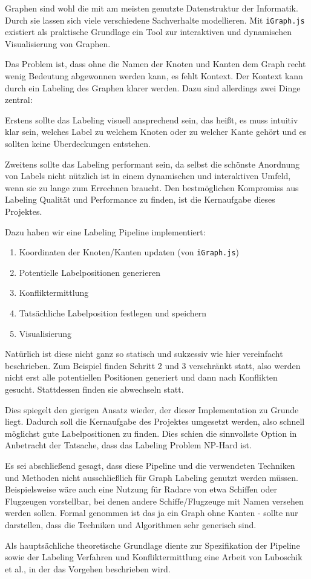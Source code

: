 Graphen sind wohl die mit am meisten genutzte Datenstruktur der Informatik.
Durch sie lassen sich viele verschiedene Sachverhalte modellieren.
Mit \texttt{iGraph.js} existiert als praktische Grundlage ein Tool zur interaktiven und dynamischen Visualisierung von Graphen.

Das Problem ist, dass ohne die Namen der Knoten und Kanten dem Graph recht wenig Bedeutung abgewonnen werden kann,
es fehlt Kontext. Der Kontext kann durch ein Labeling des Graphen klarer werden. Dazu sind allerdings zwei Dinge zentral:

Erstens sollte das Labeling visuell ansprechend sein, das heißt, es muss intuitiv klar sein, welches Label zu welchem Knoten oder zu welcher Kante gehört
und es sollten keine Überdeckungen entstehen.

Zweitens sollte das Labeling performant sein, da selbst die schönste Anordnung von Labels nicht nützlich ist in einem dynamischen und interaktiven Umfeld, wenn sie zu lange zum Errechnen braucht.
Den bestmöglichen Kompromiss aus Labeling Qualität und Performance zu finden, ist die Kernaufgabe dieses Projektes.

Dazu haben wir eine Labeling Pipeline implementiert:
\begin{enumerate}
    \item Koordinaten der Knoten/Kanten updaten (von \texttt{iGraph.js})
    \item Potentielle Labelpositionen generieren
    \item Konfliktermittlung
    \item Tatsächliche Labelposition festlegen und speichern
    \item Visualisierung
\end{enumerate}

Natürlich ist diese nicht ganz so statisch und sukzessiv wie hier vereinfacht beschrieben.
Zum Beispiel finden Schritt 2 und 3 verschränkt statt, also werden nicht erst alle potentiellen Positionen generiert und dann nach Konflikten gesucht.
Stattdessen finden sie abwechseln statt.

Dies spiegelt den gierigen Ansatz wieder, der dieser Implementation zu Grunde liegt. Dadurch soll die Kernaufgabe des Projektes umgesetzt werden,
also schnell möglichst gute Labelpositionen zu finden. Dies schien die sinnvollste Option in Anbetracht der Tatsache, dass das Labeling Problem NP-Hard ist.

Es sei abschließend gesagt, dass diese Pipeline und die verwendeten Techniken und Methoden nicht ausschließlich für Graph Labeling genutzt werden müssen.
Beispielsweise wäre auch eine Nutzung für Radare von etwa Schiffen oder Flugzeugen vorstellbar, bei denen andere Schiffe/Flugzeuge mit Namen versehen werden sollen.
Formal genommen ist das ja ein Graph ohne Kanten - sollte nur darstellen, dass die Techniken und Algorithmen sehr generisch sind.

Als hauptsächliche theoretische Grundlage diente zur Spezifikation der Pipeline sowie der Labeling Verfahren und Konfliktermittlung eine Arbeit von Luboschik et al.\cite{RN38}, in der das Vorgehen beschrieben wird.